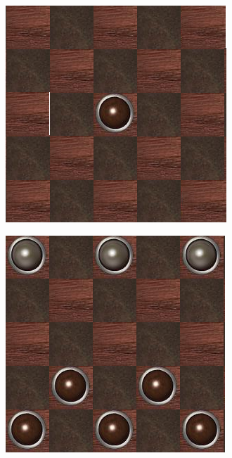 \documentclass[11pt]{article} %
\begin{document}
\begin{figure}[!htb]
	\caption{  }
	\label{fig_sim}
	{
	\includegraphics[width=\linewidth]{1Q}
	\label{paysage}
	}
\endminipage\hfill
{}
	\caption{  }
	\label{fig_sim}
	{
	\includegraphics[width=\linewidth]{2}
}
\end{figure}
\end{document}
